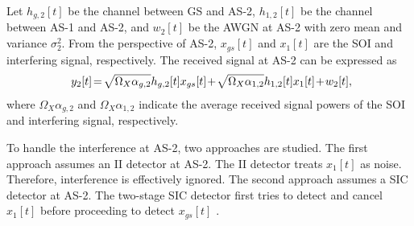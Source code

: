 Let $h_{g,2}[t]$ be the channel between GS and AS-2, $h_{1,2}[t]$ be the channel between AS-1 and AS-2, and $w_{2}[t]$ be the AWGN at AS-2 with zero mean and variance $\sigma^2_2$. From the perspective of AS-2, $x_{gs}[t]$ and $x_1[t]$ are the SOI and interfering signal, respectively. The received signal at AS-2 can be expressed as
\begin{eqnarray} \label{interference_management_HBD_ACS_y_as2}
y_{2}[t] \hspace{-0.05cm} = \hspace{-0.05cm} \sqrt{\Omega_{X}\alpha_{g,2}}h_{g,2}[t]x_{gs}[t] \hspace{-0.05cm} + \hspace{-0.05cm} \sqrt{\Omega_{X}\alpha_{1,2}}h_{1,2}[t]x_{1}[t] \hspace{-0.05cm} + \hspace{-0.05cm} w_{2}[t], \hspace{-0.15cm}
\end{eqnarray}
where $\Omega_{X}\alpha_{g,2}$ and $\Omega_{X}\alpha_{1,2}$ indicate the average received signal powers of the SOI and interfering signal, respectively. 

To handle the interference at AS-2, two approaches are studied. The first approach assumes an II detector at AS-2. The II detector treats $x_1[t]$ as noise. Therefore, interference is effectively ignored. The second approach assumes a SIC detector at AS-2. The two-stage SIC detector first tries to detect and cancel $x_1[t]$ before proceeding to detect $x_{gs}[t]$ \cite{narasimhan2007individual}. 

\begin{table}[]
\centering
\caption{Summary of Important Notations}
\label{table:interference_management_HBD_ACS_summary_impt_notations} 
\end{table}

